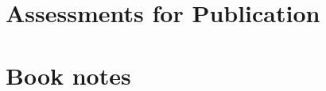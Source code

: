\documentclass{book}
\begin{document}



\appendix

\chapter{Assessments for Publication}
\newpage %
\newpage  %

\chapter{Book notes}
\newpage
\newpage
\newpage
\newpage
\newpage
\newpage
\newpage
\newpage
\newpage



\clearpage

\printglossaries

\nocite{*} %


\end{document}
